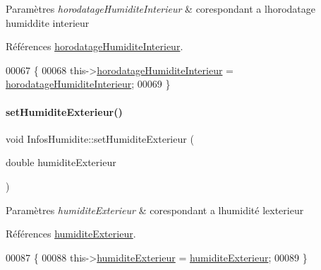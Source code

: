 \begin{DoxyParams}{Paramètres}
{\em horodatage\+Humidite\+Interieur} & corespondant a l\textquotesingle{}horodatage humiddite interieur \\
\hline
\end{DoxyParams}


Références \hyperlink{class_infos_humidite_a38712bac5a2d4d106a016647ad39fedf}{horodatage\+Humidite\+Interieur}.


\begin{DoxyCode}
00067 \{
00068     this->\hyperlink{class_infos_humidite_a38712bac5a2d4d106a016647ad39fedf}{horodatageHumiditeInterieur} = 
      \hyperlink{class_infos_humidite_a38712bac5a2d4d106a016647ad39fedf}{horodatageHumiditeInterieur};
00069 \}
\end{DoxyCode}
\mbox{\label{class_infos_humidite_a8228ff1f1d0466df228ed3f2e2d269ac}} 
\paragraph{\texorpdfstring{set\+Humidite\+Exterieur()}{setHumiditeExterieur()}}
{\footnotesize\ttfamily void Infos\+Humidite\+::set\+Humidite\+Exterieur (\begin{DoxyParamCaption}\item[{double}]{humidite\+Exterieur }\end{DoxyParamCaption})}


\begin{DoxyParams}{Paramètres}
{\em humidite\+Exterieur} & corespondant a l\textquotesingle{}humidité l\textquotesingle{}exterieur \\
\hline
\end{DoxyParams}


Références \hyperlink{class_infos_humidite_a503a9c849508928d3046292f17f37230}{humidite\+Exterieur}.


\begin{DoxyCode}
00087 \{
00088     this->\hyperlink{class_infos_humidite_a503a9c849508928d3046292f17f37230}{humiditeExterieur} = \hyperlink{class_infos_humidite_a503a9c849508928d3046292f17f37230}{humiditeExterieur};
00089 \}
\end{DoxyCode}
\mbox{\label{class_infos_humidite_a238c8b3bd6b09c4f770058a05468baa8}} 
